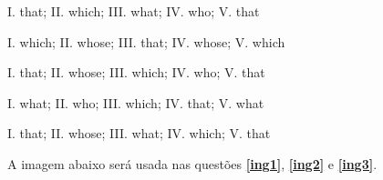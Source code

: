 \begin{alternativas}
  \item I. that; II. which; III. what; IV. who; V. that 
  \item I. which; II. whose; III. that; IV. whose; V. which 
  \item I. that; II. whose; III. which; IV. who; V. that 
  \item I. what; II. who; III. which; IV. that; V. what 
  \item I. that; II. whose; III. what; IV. which; V. that
\end{alternativas}

\pagebreak
\noindent A imagem abaixo será usada nas questões \textbf{\ref{ing1}}, \textbf{\ref{ing2}} e \textbf{\ref{ing3}}.
\inc